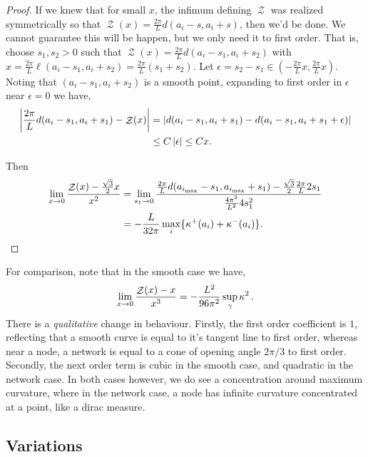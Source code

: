 \documentclass[11pt]{amsart}
\DeclareMathOperator{\chordarcprofile}{\mathcal{Z}}
\begin{document}
\begin{proof}
If we knew that for small \(x\), the infimum defining \(\chordarcprofile\) was realized symmetrically so that \(\chordarcprofile(x) = \tfrac{2\pi}{L} d(a_i - s, a_i + s)\), then we'd be done. We cannot guarantee this will be happen, but we only need it to first order. That is, choose \(s_1, s_2 > 0\) such that \(\chordarcprofile(x) = \tfrac{2\pi}{L} d(a_i - s_1, a_i + s_2)\) with \(x = \tfrac{2\pi}{L} \ell(a_i - s_1, a_i + s_2) = \tfrac{2\pi}{L} (s_1 + s_2)\). Let \(\epsilon = s_2 - s_1 \in (-\tfrac{2\pi}{L} x, \tfrac{2\pi}{L}x)\). Noting that \((a_i - s_1, a_i + s_2)\) is a smooth point, expanding to first order in \(\epsilon\) near \(\epsilon = 0\) we have,
\[
\begin{split}
\abs{\frac{2\pi}{L} d(a_i - s_1, a_i + s_1) - \chordarcprofile(x)} &= \abs{d(a_i - s_1, a_i + s_1) - d(a_i - s_1, a_i + s_1 + \epsilon)} \\
&\leq C\abs{\epsilon} \leq C x.
\end{split}
\]

Then
\[
\begin{split}
\lim_{x\to 0} \frac{\chordarcprofile(x) - \tfrac{\sqrt{3}}{2}x}{x^2} &= \lim_{s_1\to 0} \frac{\tfrac{2\pi}{L} d(a_{i_{\max}} - s_1, a_{i_{\max}} + s_1) - \tfrac{\sqrt{3}}{2} \tfrac{2\pi}{L} 2s_1}{\tfrac{4\pi^2}{L^2} 4 s_1^2} \\
&= - \frac{L}{32\pi} \max_i \{\curvecurv^+(a_i) + \curvecurv^-(a_i)\}.
\end{split}
\]
\end{proof}

\begin{remark}
For comparison, note that in the smooth case we have,
\[
\lim_{x\to 0} \frac{\chordarcprofile(x) - x}{x^3} = - \frac{L^2}{96 \pi^2} \sup_{\gamma} \curvecurv^2.
\]
There is a \emph{qualitative} change in behaviour. Firstly, the first order coefficient is \(1\), reflecting that a smooth curve is equal to it's tangent line to first order, whereas near a node, a network is equal to a cone of opening angle \(2\pi/3\) to first order.  Secondly, the next order term is cubic in the smooth case, and quadratic in the network case. In both cases however, we do see a concentration around maximum curvature, where in the network case, a node has infinite curvature concentrated at a point, like a dirac measure.
\end{remark}

\subsection{Variations}
\label{sec:orgheadline8}
\end{document}
